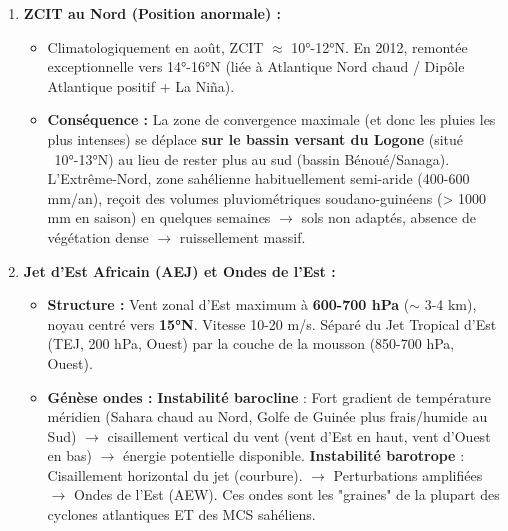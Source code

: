 \documentclass[11pt]{article}
\begin{document}
\begin{exoresolu}
\begin{enumerate}
\begin{itemize}
          \end{itemize}
          \textbf{2. Les Ondes de l'Est (African Easterly Waves - AEW) :}
          \begin{itemize}
              \item \textbf{Origine :} Instabilité du \textbf{Jet d'Est Africain (AEJ)} (niveau ~600-700 hPa, noyau ~15°N, vitesse 10-15 m/s). Instabilité barocline (cisaillement vertical + gradient température méridien) et barotrope (cisaillement horizontal).
              \item \textbf{Mécanisme :} Onde de longueur 2000-4000 km, période 3-5 jours, vitesse phase ~8 m/s vers Ouest. \textbf{Avant de l'onde (côté Est) :} Convergence basse couche + divergence altitude $\rightarrow$ \textbf{déclenchement/organisation convection profonde (MCS/Lignes de grain)}. Pluies intenses, localisées, superposées aux pluies mousson $\rightarrow$ \textbf{cumul extrême}.
          \end{itemize}
    \item \textbf{ZCIT au Nord (Position anormale) :}
          \begin{itemize}
              \item Climatologiquement en août, ZCIT $\approx$ 10°-12°N. En 2012, remontée exceptionnelle vers 14°-16°N (liée à Atlantique Nord chaud / Dipôle Atlantique positif + La Niña).
              \item \textbf{Conséquence :} La zone de convergence maximale (et donc les pluies les plus intenses) se déplace \textbf{sur le bassin versant du Logone} (situé ~10°-13°N) au lieu de rester plus au sud (bassin Bénoué/Sanaga). L'Extrême-Nord, zone sahélienne habituellement semi-aride (400-600 mm/an), reçoit des volumes pluviométriques soudano-guinéens (> 1000 mm en saison) en quelques semaines $\rightarrow$ sols non adaptés, absence de végétation dense $\rightarrow$ ruissellement massif.
          \end{itemize}
    \item \textbf{Jet d'Est Africain (AEJ) et Ondes de l'Est :}
          \begin{itemize}
              \item \textbf{Structure :} Vent zonal d'Est maximum à \textbf{600-700 hPa} ($\sim$ 3-4 km), noyau centré vers \textbf{15°N}. Vitesse 10-20 m/s. Séparé du Jet Tropical d'Est (TEJ, 200 hPa, Ouest) par la couche de la mousson (850-700 hPa, Ouest).
              \item \textbf{Génèse ondes :} \textbf{Instabilité barocline} : Fort gradient de température méridien (Sahara chaud au Nord, Golfe de Guinée plus frais/humide au Sud) $\rightarrow$ cisaillement vertical du vent (vent d'Est en haut, vent d'Ouest en bas) $\rightarrow$ énergie potentielle disponible. \textbf{Instabilité barotrope} : Cisaillement horizontal du jet (courbure). $\rightarrow$ Perturbations amplifiées $\rightarrow$ Ondes de l'Est (AEW). Ces ondes sont les "graines" de la plupart des cyclones atlantiques ET des MCS sahéliens.

\end{itemize}
\end{enumerate}
\end{exoresolu}
\end{document}
